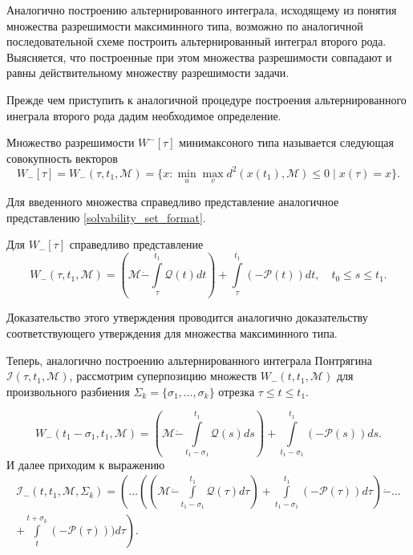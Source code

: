 Аналогично построению альтернированного интеграла, исходящему из понятия множества разрешимости
 максиминного типа, возможно по аналогичной последовательной схеме построить альтернированный
 интеграл второго рода. Выясняется, что построенные при этом множества разрешимости совпадают
 и равны действительному множеству разрешимости задачи.

Прежде чем приступить к аналогичной процедуре построения альтернированного инеграла второго рода
дадим необходимое определение.

\begin{definition}
    Множество разрешимости \( W^-[\tau] \) минимаксоного типа называется следующая совокупность
     векторов
    \[
        W_-[\tau] = W_-(\tau, t_1, \mathcal{M}) = \{ x : \min_u \max_v d^2(x(t_1),
         \mathcal{M}) \le 0 \mid x(\tau) = x \}.
    \]
\end{definition}
Для введенного множества справедливо представление аналогичное представлению 
 \eqref{solvability_set_format}.
\begin{statement}
    Для \( W_-[\tau] \) справедливо представление
    \begin{equation}
        W_-(\tau, t_1, \mathcal{M}) = \left( \mathcal{M} \dot{-} \int\limits_{\tau}^{t_1}
         \mathcal{Q}(t) dt \right) + \int\limits_{\tau}^{t_1} (-\mathcal{P}(t)) dt, \quad 
         t_0 \le s \le t_1.
    \end{equation}
\end{statement}
Доказательство этого утверждения проводится аналогично доказательству соответствующего утверждения для
 множества максиминного типа.

Теперь, аналогично построению альтернированного интеграла Понтрягина \( \mathcal{I}(\tau, t_1,
 \mathcal{M}) \), рассмотрим суперпозицию множеств \( W_-(t, t_1, \mathcal{M}) \) для произвольного
 разбиения \( \Sigma_k = \{ \sigma_1, \dots, \sigma_k\} \) отрезка \( \tau \le t \le t_1 \).

\[
    W_-(t_1 - \sigma_1, t_1, \mathcal{M}) = \left( \mathcal{M} \dot{-} \int\limits_{t_1 - 
     \sigma_1}^{t_1} \mathcal{Q}(s) ds \right) + \int\limits_{t_1 - \sigma_1}^{t_1} (-\mathcal{P}(s))ds.
\]
И далее приходим к выражению
\begin{multline}\label{}
    \mathcal{I}_-(t, t_1, \mathcal{M}, \Sigma_k) = \left(\dots\left(\left(\mathcal{M} \dot{-}
     \int\limits_{t_1 - \sigma_1}^{t_1} \mathcal{Q}(\tau) d\tau \right) + \int\limits_{t_1 - 
     \sigma_1}^{t_1}(-\mathcal{P}(\tau)) d\tau \right) \dot{-} \dots \right. \\
    \left. + \int\limits_{t}^{t + \sigma_k} (-\mathcal{P}(\tau))) d\tau \right) .
\end{multline}

